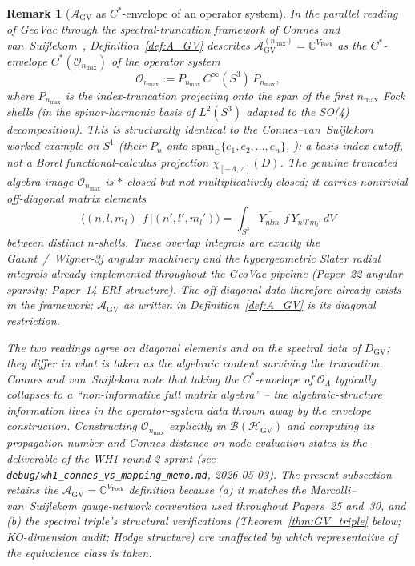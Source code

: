 \documentclass[11pt]{article}
\newtheorem{remark}{Remark}
\begin{document}
\begin{remark}[$\mathcal{A}_{\mathrm{GV}}$ as $C^*$-envelope of an operator system]
\label{rem:operator_system}
In the parallel reading of GeoVac through the spectral-truncation
framework of Connes and van~Suijlekom~\cite{connes_vs2021},
Definition~\ref{def:A_GV} describes
$\mathcal{A}_{\mathrm{GV}}^{(n_{\max})} = \mathbb{C}^{V_{\mathrm{Fock}}}$
as the $C^*$-envelope $C^*(\mathcal{O}_{n_{\max}})$ of the operator
system
\[
   \mathcal{O}_{n_{\max}} := P_{n_{\max}} \, C^\infty(S^3) \, P_{n_{\max}},
\]
where $P_{n_{\max}}$ is the index-truncation projecting onto the
span of the first $n_{\max}$ Fock shells (in the spinor-harmonic
basis of $L^2(S^3)$ adapted to the SO(4) decomposition).  This is
structurally identical to the Connes--van~Suijlekom worked example
on $S^1$ (their $P_n$ onto $\mathrm{span}_{\mathbb{C}}\{e_1, e_2,
\ldots, e_n\}$, \cite[\S 3.1]{connes_vs2021}): a basis-index cutoff,
not a Borel functional-calculus projection
$\chi_{[-\Lambda, \Lambda]}(D)$.  The genuine truncated algebra-image
$\mathcal{O}_{n_{\max}}$ is $*$-closed but \emph{not} multiplicatively
closed; it carries nontrivial off-diagonal matrix elements
\[
   \langle (n,l,m_l) | \, f \, | (n', l', m_l') \rangle
   = \int_{S^3} \overline{Y_{n l m_l}}\, f \, Y_{n' l' m_l'}\, dV
\]
between distinct $n$-shells.  These overlap integrals are exactly
the Gaunt~/~Wigner-3j angular machinery and the hypergeometric
Slater radial integrals already implemented throughout the GeoVac
pipeline (Paper~22 angular sparsity; Paper~14 ERI structure).  The
off-diagonal data therefore already exists in the framework;
$\mathcal{A}_{\mathrm{GV}}$ as written in Definition~\ref{def:A_GV}
is its diagonal restriction.

The two readings agree on diagonal elements and on the spectral
data of $D_{\mathrm{GV}}$; they differ in what is taken as the
algebraic content surviving the truncation.  Connes and
van~Suijlekom note that taking the $C^*$-envelope of $\mathcal{O}_\Lambda$
typically collapses to a ``non-informative full matrix algebra'' --
the algebraic-structure information lives in the operator-system
data thrown away by the envelope construction.  Constructing
$\mathcal{O}_{n_{\max}}$ explicitly in $\mathcal{B}(\mathcal{H}_{\mathrm{GV}})$
and computing its propagation number and Connes distance on
node-evaluation states is the deliverable of the WH1 round-2 sprint
(see \texttt{debug/wh1\_connes\_vs\_mapping\_memo.md}, 2026-05-03).
The present subsection retains the
$\mathcal{A}_{\mathrm{GV}} = \mathbb{C}^{V_{\mathrm{Fock}}}$ definition
because (a) it matches the Marcolli--van~Suijlekom gauge-network
convention used throughout Papers~25 and~30, and (b) the spectral
triple's structural verifications (Theorem~\ref{thm:GV_triple}
below; KO-dimension audit; Hodge structure) are unaffected by
which representative of the equivalence class is taken.
\end{remark}
\end{document}
